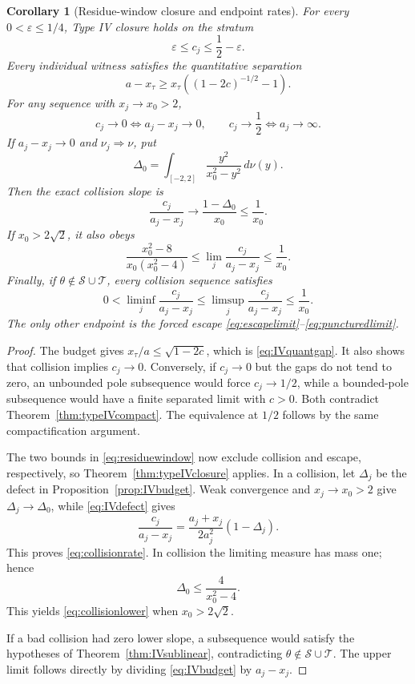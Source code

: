 \documentclass[11pt,reqno]{amsart}
\newtheorem{corollary}[theorem]{Corollary}
\theoremstyle{definition}
\theoremstyle{remark}
\newcommand{\calS}{\mathcal S}
\newcommand{\calT}{\mathcal T}
\begin{document}
\begin{corollary}[Residue-window closure and endpoint rates]
\label{cor:IVrates}
For every $0<\varepsilon\le1/4$, Type IV closure holds on the stratum
\begin{equation}\label{eq:residuewindow}
 \varepsilon\le c_j\le\frac12-\varepsilon.
\end{equation}
Every individual witness satisfies the quantitative separation
\begin{equation}\label{eq:IVquantgap}
 a-x_\tau\ge
 x_\tau\left((1-2c)^{-1/2}-1\right).
\end{equation}
For any sequence with $x_j\to x_0>2$,
\[
 c_j\to0\iff a_j-x_j\to0,
 \qquad
 c_j\to\frac12\iff a_j\to\infty.
\]
If $a_j-x_j\to0$ and $\nu_j\Rightarrow\nu$, put
\[
 \Delta_0=\int_{[-2,2]}\frac{y^2}{x_0^2-y^2}\,d\nu(y).
\]
Then the exact collision slope is
\begin{equation}\label{eq:collisionrate}
 \frac{c_j}{a_j-x_j}\longrightarrow\frac{1-\Delta_0}{x_0}
 \le\frac1{x_0}.
\end{equation}
If $x_0>2\sqrt2$, it also obeys
\begin{equation}\label{eq:collisionlower}
 \frac{x_0^2-8}{x_0(x_0^2-4)}
 \le\lim_j\frac{c_j}{a_j-x_j}\le\frac1{x_0}.
\end{equation}
Finally, if $\theta\notin\calS\cup\calT$, every collision sequence satisfies
\begin{equation}\label{eq:badcollisionrate}
 0<\liminf_j\frac{c_j}{a_j-x_j}
 \le\limsup_j\frac{c_j}{a_j-x_j}\le\frac1{x_0}.
\end{equation}
The only other endpoint is the forced escape
\eqref{eq:escapelimit}--\eqref{eq:puncturedlimit}.
\end{corollary}

\begin{proof}
The budget gives $x_\tau/a\le\sqrt{1-2c}$, which is
\eqref{eq:IVquantgap}.  It also shows that collision implies $c_j\to0$.
Conversely, if $c_j\to0$ but the gaps do not tend to zero, an unbounded
pole subsequence would force $c_j\to1/2$, while a bounded-pole subsequence
would have a finite separated limit with $c>0$.  Both contradict
Theorem~\ref{thm:typeIVcompact}.  The equivalence at $1/2$ follows by the
same compactification argument.

The two bounds in \eqref{eq:residuewindow} now exclude collision and escape,
respectively, so Theorem~\ref{thm:typeIVclosure} applies.  In a collision,
let $\Delta_j$ be the defect in Proposition~\ref{prop:IVbudget}.  Weak
convergence and $x_j\to x_0>2$ give $\Delta_j\to\Delta_0$, while
\eqref{eq:IVdefect} gives
\[
 \frac{c_j}{a_j-x_j}
 =\frac{a_j+x_j}{2a_j^2}(1-\Delta_j).
\]
This proves \eqref{eq:collisionrate}.  In collision the limiting measure has
mass one; hence
\[
 \Delta_0\le\frac4{x_0^2-4}.
\]
This yields \eqref{eq:collisionlower} when $x_0>2\sqrt2$.

If a bad collision had zero lower slope, a subsequence would satisfy the
hypotheses of Theorem~\ref{thm:IVsublinear}, contradicting
$\theta\notin\calS\cup\calT$.  The upper limit follows directly by dividing
\eqref{eq:IVbudget} by $a_j-x_j$.
\end{proof}
\end{document}
